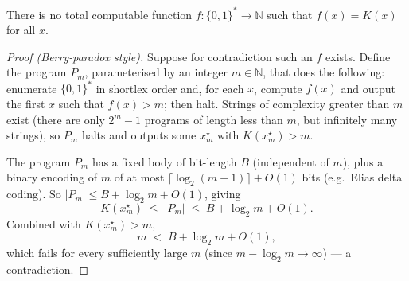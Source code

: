 \begin{theorem}[Uncomputability of $K$]
\label{thm:uncomputable}
There is no total computable function $f : \{0,1\}^* \to \mathbb{N}$
such that $f(x) = K(x)$ for all $x$.
\end{theorem}

\begin{proof}[Proof (Berry-paradox style)]
Suppose for contradiction such an $f$ exists.  Define the program
$P_m$, parameterised by an integer $m \in \mathbb{N}$, that does the
following: enumerate $\{0,1\}^*$ in shortlex order and, for each $x$,
compute $f(x)$ and output the first $x$ such that $f(x) > m$; then
halt.  Strings of complexity greater than $m$ exist (there are only
$2^m - 1$ programs of length less than $m$, but infinitely many
strings), so $P_m$ halts and outputs some $x_m^\star$ with
$K(x_m^\star) > m$.

The program $P_m$ has a fixed body of bit-length $B$ (independent of
$m$), plus a binary encoding of $m$ of at most
$\lceil \log_2(m+1) \rceil + O(1)$ bits (e.g.\ Elias delta coding).
So $|P_m| \le B + \log_2 m + O(1)$, giving
\begin{equation}
  K(x_m^\star) \;\le\; |P_m| \;\le\; B + \log_2 m + O(1).
  \label{eq:berry-upper}
\end{equation}
Combined with $K(x_m^\star) > m$,
\begin{equation}
  m \;<\; B + \log_2 m + O(1),
  \label{eq:berry-contra}
\end{equation}
which fails for every sufficiently large $m$ (since $m - \log_2 m
\to \infty$) --- a contradiction.
\end{proof}

